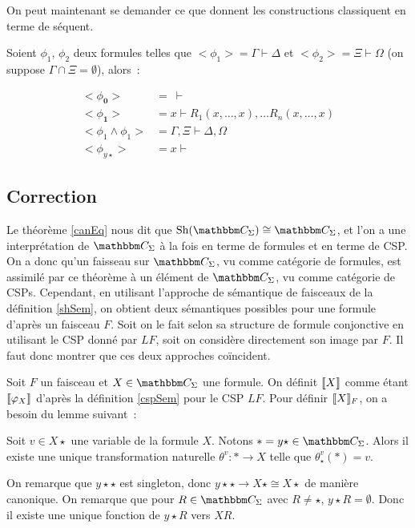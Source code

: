 On peut maintenant se demander ce que donnent les constructions classiquent en terme
de séquent.

\begin{lem}\label{seqStandarts}
    Soient $\phi_1$, $\phi_2$ deux formules telles que $<\phi_1> = \Gamma\vdash\Delta$ et
    $<\phi_2> = \Xi\vdash\Omega$ (on suppose $\Gamma\cap\Xi=\emptyset$), alors~:

    \begin{align*}
        <\phi_\mathbf{0}> &=~\vdash \\
        <\phi_\mathbf{1}> &= x\vdash R_1(x,\dots, x),\dots R_n(x, \dots, x) \\
        <\phi_1\wedge\phi_1> &= \Gamma,\Xi\vdash\Delta,\Omega \\
        <\phi_{y\star}> &= x\vdash
    \end{align*}
\end{lem}

\subsection{Correction}

Le théorème \ref{canEq} nous dit que $\sh(\C_\Sigma)\cong \C_\Sigma$, et l'on a
une interprétation de $\C_\Sigma$ à la fois en terme de formules et en terme de
CSP.  On a donc qu'un faisseau sur $\C_\Sigma$, vu comme catégorie de formules,
est assimilé par ce théorème à un élément de $\C_\Sigma$, vu comme catégorie de
CSPs.  Cependant, en utilisant l'approche de sémantique de faisceaux de la
définition \ref{shSem}, on obtient deux sémantiques possibles pour une formule
d'après un faisceau $F$.  Soit on le fait selon sa structure de formule
conjonctive en utilisant le CSP donné par $LF$, soit on considère directement
son image par $F$. Il faut donc montrer que ces deux approches coïncident.

Soit $F$ un faisceau et $X\in\C_\Sigma$ une formule. On définit $\llbracket {X} \rrbracket$ comme
étant $\llbracket {\varphi_X} \rrbracket$ d'après la définition \ref{cspSem} pour le CSP $LF$. Pour
définir $\llbracket {X} \rrbracket_F$, on a besoin du lemme suivant~:

\begin{lem}
    Soit $v\in X\star$ une variable de la formule $X$. Notons
    $\ast = y\star\in\C_\Sigma$. Alors il existe une unique transformation naturelle
    $\theta^v : \ast\rightarrow X$ telle que $\theta^v_\star(*) = v$.
\end{lem}

\begin{pv}
    On remarque que $y\star\star$ est singleton, donc
    $y\star\star\rightarrow X\star\cong X\star$ de manière canonique. On remarque que pour
    $R\in\C_\Sigma$ avec $R\neq\star$, $y\star R=\emptyset$. Donc il existe une unique
    fonction de $y\star R$ vers $X R$. 
\end{pv}

